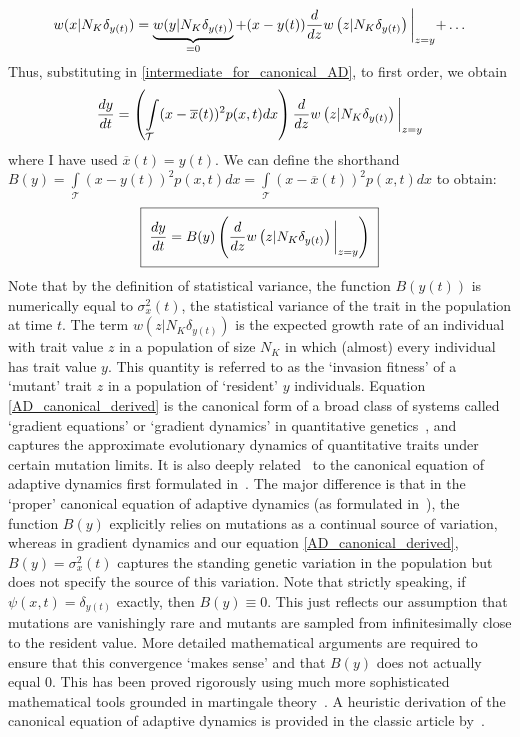 \begin{equation*}
    w(x|N_K\delta_{y(t)}) = \underbrace{w(y|N_K\delta_{y(t)})}_{=0} + (x-y(t))\frac{d}{dz}w\left(z|N_K\delta_{y(t)}\right)\biggl{|}_{z=y} + \ldots
\end{equation*}
Thus, substituting in \eqref{intermediate_for_canonical_AD}, to first order, we obtain
\begin{equation*}
    \frac{dy}{dt} = \left(\int\limits_{\mathcal{T}}(x-\overline{x}(t))^2p(x,t)dx\right)\frac{d}{dz}w\left(z|N_K\delta_{y(t)}\right)\biggl{|}_{z=y}
\end{equation*}
where I have used $\overline{x}(t) = y(t)$. We can define the shorthand $B(y) =\int\limits_{\mathcal{T}}(x-y(t))^2p(x,t)dx = \int\limits_{\mathcal{T}}(x-\overline{x}(t))^2p(x,t)dx$ to obtain:
\begin{equation}
    \label{AD_canonical_derived}
    \setlength{\fboxsep}{2\fboxsep}\boxed{\frac{dy}{dt} = B(y)\left(\frac{d}{dz}w\left(z|N_K\delta_{y(t)}\right)\biggl{|}_{z=y}\right)}
\end{equation}
Note that by the definition of statistical variance, the function $B(y(t))$ is numerically equal to $\sigma^2_{x}(t)$, the statistical variance of the trait in the population at time $t$. The term $w\left(z|N_K\delta_{y(t)}\right)$ is the expected growth rate of an individual with trait value $z$ in a population of size $N_K$ in which (almost) every individual has trait value $y$. This quantity is referred to as the `invasion fitness' of a `mutant' trait $z$ in a population of `resident' $y$ individuals. Equation \eqref{AD_canonical_derived} is the canonical form of a broad class of systems called `gradient equations' or `gradient dynamics' in quantitative genetics~\citep{lande_quantitative_1982, abrams_relationship_1993, lehtonen_price_2018, lion_theoretical_2018}, and captures the approximate evolutionary dynamics of quantitative traits under certain mutation limits.  It is also deeply related~\citep{lehtonen_price_2018, lion_theoretical_2018} to the canonical equation of adaptive dynamics first formulated in~\citet{dieckmann_dynamical_1996}. The major difference is that in the `proper' canonical equation of adaptive dynamics (as formulated in~\citet{dieckmann_dynamical_1996}), the function $B(y)$ explicitly relies on mutations as a continual source of variation, whereas in gradient dynamics and our equation \eqref{AD_canonical_derived}, $B(y)=\sigma^2_{x}(t)$ captures the standing genetic variation in the population but does not specify the source of this variation. Note that strictly speaking, if $\psi(x,t) = \delta_{y(t)}$ exactly, then $B(y) \equiv 0$. This just reflects our assumption that mutations are vanishingly rare and mutants are sampled from infinitesimally close to the resident value. More detailed mathematical arguments are required to ensure that this convergence `makes sense' and that $B(y)$ does not actually equal 0. This has been proved rigorously using much more sophisticated mathematical tools grounded in martingale theory~\citep{champagnat_unifying_2006}. A heuristic derivation of the canonical equation of adaptive dynamics is provided in the classic article by~\citet{dieckmann_dynamical_1996}.

